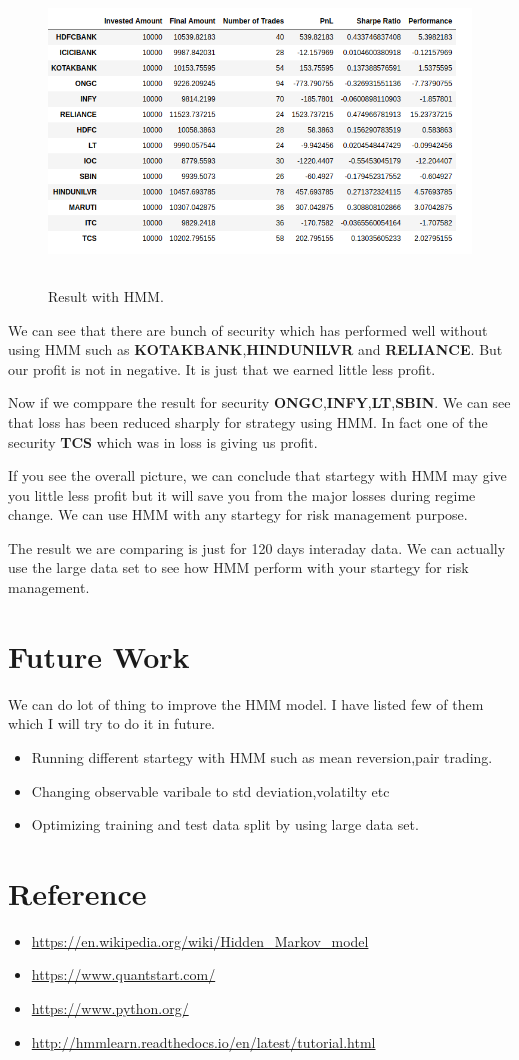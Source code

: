 \documentclass{report}
\begin{document}
\begin{figure}[h!]
  \includegraphics[width=15cm, height=8cm]{Result_With_HMM.png}
  \caption{Result with HMM.}
  \label{fig:hmm}
\end{figure}


We can see that there are bunch of security which has performed well without using HMM such as \textbf{KOTAKBANK},\textbf{HINDUNILVR} and \textbf{RELIANCE}. But our profit is not in negative. It  is just that we earned little less profit.

Now if we comppare the result for security \textbf{ONGC},\textbf{INFY},\textbf{LT},\textbf{SBIN}. We can see that loss has been reduced sharply for strategy using HMM. In fact one of the security \textbf{TCS} which was in loss is giving us profit.

If you see the overall picture, we can conclude that startegy with HMM may give you little less profit but it will save you from the major losses during regime change. We can use HMM with any startegy for risk management purpose.

The result we are comparing is just for 120 days interaday data. We can actually use the large data set to see how HMM perform with your startegy for risk management.


\chapter{Future Work}
We can do lot of thing to improve the HMM model. I have listed few of them which I will try to do it in future.

\begin{itemize}
\item Running different startegy with HMM such as mean reversion,pair trading.
\item Changing observable varibale to std deviation,volatilty etc
\item Optimizing training and test data split by using large data set. 
\end{itemize}


\chapter{Reference}

\begin{itemize}
\item \url{https://en.wikipedia.org/wiki/Hidden_Markov_model}
\item \url{https://www.quantstart.com/}
\item \url{https://www.python.org/}
\item \url{http://hmmlearn.readthedocs.io/en/latest/tutorial.html}
\end{itemize}
\end{document}
